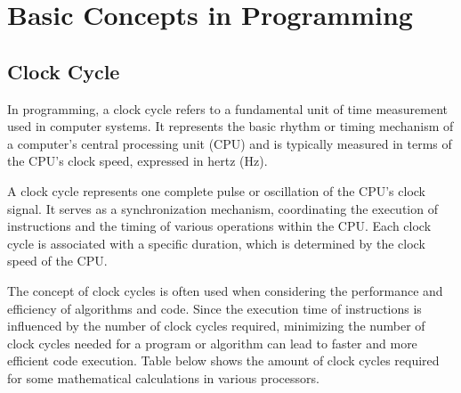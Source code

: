 \documentclass{article}
\begin{document}
\newcommand{\vecthreeBF}[1]{\vec{\textbf{#1}}}
\newcommand{\vecthree}[1]{\vec{#1}}

\newcommand{\parDeriv}[2]{\frac{\partial #1}{\partial #2}}
\newcommand{\parDerivS}[2]{\frac{\partial^2 #1}{\partial #2^2}}
\newcommand{\derivS}[2]{\frac{d^2 #1}{d#2^2}}

\newcommand{\dotProdBF}[2]{\vecthreeBF{#1} \cdot \vecthreeBF{#2}}
\newcommand{\dotProd}[2]{\vecthree{#1} \cdot \vecthree{#2}}

\newcommand{\crossProdBF}[2]{\vecthreeBF{#1} \times \vecthreeBF{#2}}
\newcommand{\crossProd}[2]{\vecthree{#1} \times \vecthree{#2}}


\newcommand{\fromeq}[1]{\textit{equation \ref{eq:#1}}}
\newcommand{\fromeqs}[2]{\textit{equations \ref{eq:#1} and \ref{eq:#2}}}

\newcommand{\fromch}[1]{\textit{chapter \ref{ch:#1}}}



\section{Basic Concepts in Programming}

\subsection{Clock Cycle}

In programming, a clock cycle refers to a fundamental unit of time measurement used in computer systems. 
It represents the basic rhythm or timing mechanism of a computer's central processing unit (CPU) and is typically measured in terms of the CPU's clock speed, expressed in hertz (Hz).

A clock cycle represents one complete pulse or oscillation of the CPU's clock signal. 
It serves as a synchronization mechanism, coordinating the execution of instructions and the timing of various operations within the CPU.
Each clock cycle is associated with a specific duration, which is determined by the clock speed of the CPU.

The concept of clock cycles is often used when considering the performance and efficiency of algorithms and code. 
Since the execution time of instructions is influenced by the number of clock cycles required, minimizing the number of clock cycles needed for a program or algorithm can lead to faster and more efficient code execution.
Table below shows the amount of clock cycles required for some mathematical calculations in various processors.
\end{document}

